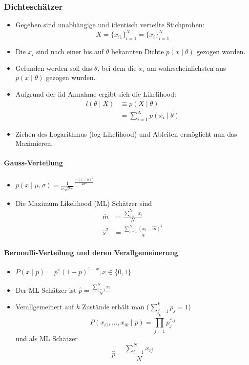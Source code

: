 \documentclass{scrartcl}
\begin{document}
\subsubsection{Dichteschätzer}

\begin{itemize}
	\item Gegeben sind unabhängige und identisch verteilte Stichproben:
	\[ X = \{ x_{i1} \}_{i=1}^N = \{ x_i \}_{i=1}^N \]
	\item Die $ x_i $ sind nach einer bis auf $ \theta $ bekannten Dichte $ p(x 
	\mid \theta) $ gezogen worden.
	\item Gefunden werden soll das $ \theta $, bei dem die $ x_i $ am 
	wahrscheinlichsten aus $ p(x \mid \theta) $ gezogen wurden.
	\item Aufgrund der iid Annahme ergibt sich die Likelihood:
	\begin{align*}
		l(\theta \mid X) &\equiv p(X \mid \theta) \\
		&= \sum_{i=1}^{N} p(x_i \mid \theta)
	\end{align*}
	\item Ziehen des Logarithmus (log-Likelihood) und Ableiten ermöglicht nun 
	das Maximieren.
\end{itemize}

\paragraph{Gauss-Verteilung}

\begin{itemize}
	\item $ p(x \mid \mu, \sigma) = \frac{1}{\sigma \sqrt{2 \pi}}^{\frac{-(x - 
	\mu)^2}{2 \sigma^2}} $
	\item Die Maximum Likelihood (ML) Schätzer sind
	\begin{align*}
		\hat{m} &= \frac{\sum_{i=1}^{N} x_i}{N} \\
		\hat{s}^2 &= \frac{\sum_{i=1}^{N} (x_i - \hat{m})^2}{N}
	\end{align*}
\end{itemize}

\paragraph{Bernoulli-Verteilung und deren Verallgemeinerung}

\begin{itemize}
	\item $ P(x \mid p) = p^x (1-p)^{1-x}, x \in \{ 0,1 \} $
	\item Der ML Schätzer ist $ \hat{p} = \frac{\sum_{i=1}^{N} x_i}{N} $
	\item Verallgemeinert auf $ k $ Zustände erhält man ($ \sum_{j=1}^{k} p_j = 
	1 $)
	\[ P(x_{i1}, \ldots, x_{ik} \mid p) = \prod_{j=1}^{k} p_j^{x_{ij}} \]
	und als ML Schätzer
	\[ \hat{p} = \frac{\sum_{i=1}^{N} x_{ij}}{N} \]
\end{itemize}
\end{document}
